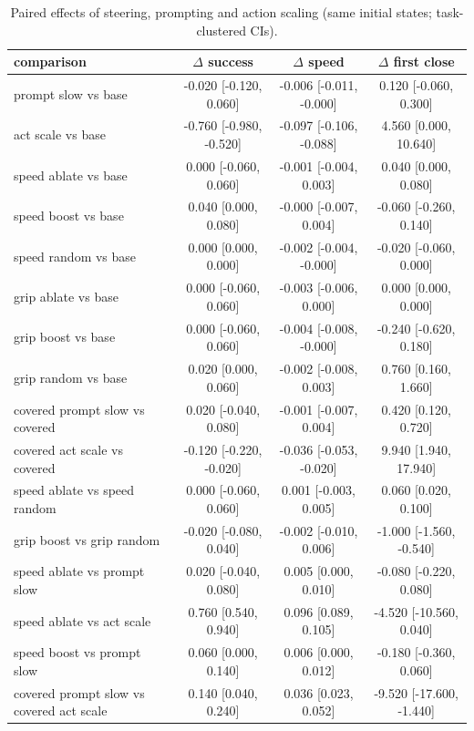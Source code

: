 \begin{table}[t]
\centering\small
\caption{Paired effects of steering, prompting and action scaling (same initial states; task-clustered CIs).}
\label{tab_E5_steer}
\begin{tabular}{l c c c}
\toprule
comparison & $\Delta$ success & $\Delta$ speed & $\Delta$ first close \\
\midrule
prompt slow vs base & -0.020 [-0.120, 0.060] & -0.006 [-0.011, -0.000] & 0.120 [-0.060, 0.300] \\
act scale vs base & -0.760 [-0.980, -0.520] & -0.097 [-0.106, -0.088] & 4.560 [0.000, 10.640] \\
speed ablate vs base & 0.000 [-0.060, 0.060] & -0.001 [-0.004, 0.003] & 0.040 [0.000, 0.080] \\
speed boost vs base & 0.040 [0.000, 0.080] & -0.000 [-0.007, 0.004] & -0.060 [-0.260, 0.140] \\
speed random vs base & 0.000 [0.000, 0.000] & -0.002 [-0.004, -0.000] & -0.020 [-0.060, 0.000] \\
grip ablate vs base & 0.000 [-0.060, 0.060] & -0.003 [-0.006, 0.000] & 0.000 [0.000, 0.000] \\
grip boost vs base & 0.000 [-0.060, 0.060] & -0.004 [-0.008, -0.000] & -0.240 [-0.620, 0.180] \\
grip random vs base & 0.020 [0.000, 0.060] & -0.002 [-0.008, 0.003] & 0.760 [0.160, 1.660] \\
covered prompt slow vs covered & 0.020 [-0.040, 0.080] & -0.001 [-0.007, 0.004] & 0.420 [0.120, 0.720] \\
covered act scale vs covered & -0.120 [-0.220, -0.020] & -0.036 [-0.053, -0.020] & 9.940 [1.940, 17.940] \\
speed ablate vs speed random & 0.000 [-0.060, 0.060] & 0.001 [-0.003, 0.005] & 0.060 [0.020, 0.100] \\
grip boost vs grip random & -0.020 [-0.080, 0.040] & -0.002 [-0.010, 0.006] & -1.000 [-1.560, -0.540] \\
speed ablate vs prompt slow & 0.020 [-0.040, 0.080] & 0.005 [0.000, 0.010] & -0.080 [-0.220, 0.080] \\
speed ablate vs act scale & 0.760 [0.540, 0.940] & 0.096 [0.089, 0.105] & -4.520 [-10.560, 0.040] \\
speed boost vs prompt slow & 0.060 [0.000, 0.140] & 0.006 [0.000, 0.012] & -0.180 [-0.360, 0.060] \\
covered prompt slow vs covered act scale & 0.140 [0.040, 0.240] & 0.036 [0.023, 0.052] & -9.520 [-17.600, -1.440] \\
\bottomrule
\end{tabular}
\end{table}
